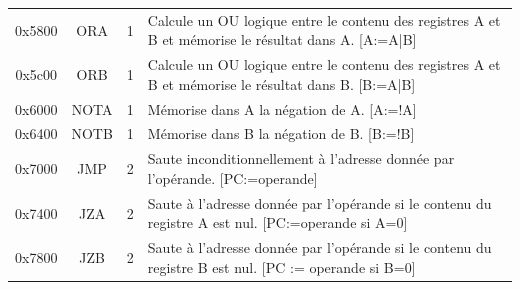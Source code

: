 \documentclass{beamer}
\begin{document}
\begin{frame}
\begin{tiny}
\begin{tabular}{cccp{10cm}}
0x5800&	ORA  &1 & Calcule un OU logique entre le contenu des registres A et B et mémorise le résultat dans A. [A:=A|B]\\
0x5c00&	ORB  &1 & Calcule un OU logique entre le contenu des registres A et B et mémorise le résultat dans B. [B:=A|B]\\
0x6000&	NOTA &1 & Mémorise dans A la négation de A. [A:=!A]\\
0x6400&	NOTB &1 &Mémorise dans B la négation de B. [B:=!B]\\
0x7000&	JMP  &2 &Saute inconditionnellement à l'adresse donnée par l'opérande. [PC:=operande]\\
0x7400&	JZA  &2 &Saute à l'adresse donnée par l'opérande si le contenu du registre A est nul. [PC:=operande si A=0]\\
0x7800&	JZB  &2 &Saute à l'adresse donnée par l'opérande si le contenu du registre B est nul. [PC := operande si B=0]
\end{tabular}
\end{tiny}

\end{frame}
\end{document}
